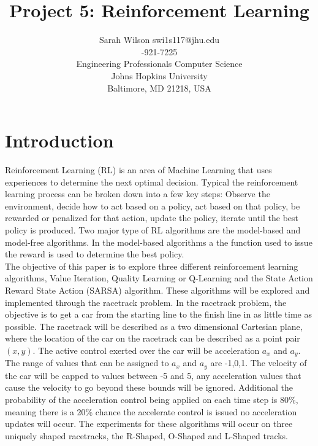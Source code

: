 \documentclass[twoside,11pt]{article}
\begin{document}
\title{Project 5: Reinforcement Learning}

\author{\name Sarah Wilson 
	   \email swi1s117@jhu.edu \\
	   -921-7225 \\
       \addr Engineering Professionals Computer Science\\
       Johns Hopkins University\\
       Baltimore, MD 21218, USA} 



\section{Introduction}
\hspace*{10mm} Reinforcement Learning (RL) is an area of Machine Learning that uses experiences to determine the next optimal decision. Typical the reinforcement learning process can be broken down into a few key steps: Observe the environment, decide how to act based on a policy, act based on that policy, be rewarded or penalized for that action, update the policy, iterate until the best policy is produced. Two major type of RL algorithms are the model-based and model-free algorithms. In the model-based algorithms a the function used to issue the reward is used to determine the best policy. \\


\hspace*{10mm} The objective of this paper is to explore three different reinforcement learning algorithms, Value Iteration, Quality Learning or Q-Learning and the State Action Reward State Action (SARSA) algorithm. These algorithms will be explored and implemented through the racetrack problem. In the racetrack problem, the objective is to get a car from the starting line to the finish line in as little time as possible. The racetrack will be described as a two dimensional Cartesian plane, where the location of the car on the racetrack can be described as a point pair $(x,y)$. The active control exerted over the car will be acceleration $a_x$ and $a_y$. The range of values that can be assigned to $a_x$ and $a_y$ are -1,0,1. The velocity of the car will be capped to values between -5 and 5, any acceleration values that cause the velocity to go beyond these bounds will be ignored. Additional the probability of the acceleration control being applied on each time step is 80\%, meaning there is a 20\% chance the accelerate control is issued no acceleration updates will occur. The experiments for these algorithms will occur on three uniquely shaped racetracks, the R-Shaped, O-Shaped and L-Shaped tracks.\\ 
\end{document}

